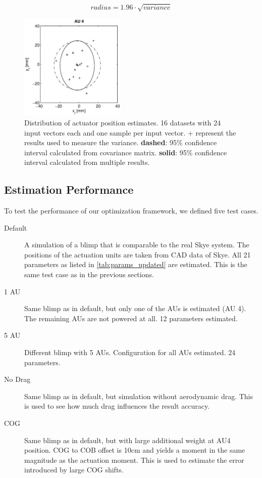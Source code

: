 \begin{equation}
\label{eq:variance_to_95pc}
radius = 1.96 \cdot \sqrt{variance}
\end{equation}

\begin{figure}[hbtp]
\centering
\includegraphics[width = 0.45\textwidth]{images/results/confidence_95_interval_AU4.eps}
\caption{Distribution of actuator position estimates. 16 datasets with 24 input vectors each and one sample per input vector.
$\mathbf{+}$ represent the results used to measure the variance.
\textbf{dashed}: 95\% confidence interval calculated from covariance matrix.
\textbf{solid}: 95\% confidence interval calculated from multiple results. }
\label{fig:result_95pc_confidence}
\end{figure}

\subsection{Estimation Performance}
\label{sub:est_perf}

To test the performance of our optimization framework, we defined five test cases.
\begin{description}
\item[Default] A simulation of a blimp that is comparable to the real Skye system. The positions of the actuation units are taken from CAD data of Skye. All 21 parameters as listed in \cref{tab:params_updated} are estimated. This is the same test case as in the previous sections.
\item[1 AU] Same blimp as in default, but only one of the AUs is estimated (AU 4). The remaining AUs are not powered at all. 12 parameters estimated.
\item[5 AU] Different blimp with 5 AUs. Configuration for all AUs estimated. 24 parameters.
\item[No Drag] Same blimp as in default, but simulation without aerodynamic drag. This is used to see how much drag influences the result accuracy.
\item[COG] Same blimp as in default, but with large additional weight at AU4 position. COG to COB offset is 10cm and yields a moment in the same magnitude as the actuation moment. This is used to estimate the error introduced by large COG shifts.
\end{description}

